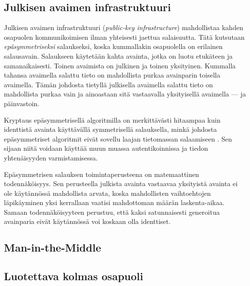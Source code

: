 \documentclass[english,gradu]{tktltiki}
\begin{document}
\subsection{Julkisen avaimen infrastruktuuri} %
\label{sub:julkisen_avaimen_infrastruktuuri}


Julkisen avaimen infrastruktuuri (\emph{public-key infrastructure}) mahdollistaa kahden osapuolen kommunikoimisen ilman yhteisesti jaettua salaisuutta. Tätä kutsutaan \emph{epäsymmetriseksi} salaukseksi, koska kummallakin osapuolella on erilainen salausavain. Salaukseen käytetään kahta avainta, jotka on luotu etukäteen ja samanaikaisesti. Toinen avaimista on julkinen ja toinen yksityinen. Kummalla tahansa avaimella salattu tieto on mahdollista purkaa avainparin toisella avaimella. Tämän johdosta tietyllä julkisella avaimella salattu tieto on mahdollista purkaa vain ja ainoastaan sitä vastaavalla yksityisellä avaimella --- ja päinvastoin.

Kryptaus epäsymmetrisellä algoritmilla on merkittävästi hitaampaa kuin identtistä avainta käyttävällä symmetrisellä salauksella, minkä johdosta epäsymmetriset algoritmit eivät sovellu laajan tietomassan salaamiseen \cite{nist_pki_intro, NIST_SP800-63}. Sen sijaan niitä voidaan käyttää muun muassa autentikoinnissa ja tiedon yhtenäisyyden varmistamisessa.

Epäsymmetrisen salauksen toimintaperusteena on matemaattinen todennäköisyys. Sen perusteella julkista avainta vastaavaa yksityistä avainta ei ole käytännössä mahdollista arvata, koska mahdollisten vaihtoehtojen läpikäyminen yksi kerrallaan vaatisi mahdottoman määrän laskenta-aikaa. Samaan todennäköisyyteen perustuu, että kaksi satunnaisesti generoitua avainparia eivät käytännössä voi koskaan olla identtiset.


\subsection{Man-in-the-Middle} %
\label{sub:man_in_the_middle}

\subsection{Luotettava kolmas osapuoli} %
\label{sub:luotettava_kolmas_osapuoli}
\end{document}
